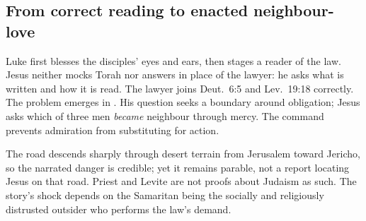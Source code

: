 \elementguard
\subsection*{From correct reading to enacted neighbour-love }

Luke first blesses the disciples' eyes and ears, then stages a reader of the
law. Jesus neither mocks Torah nor answers in place of the lawyer: he asks
what is written and how it is read. The lawyer joins Deut.~6:5 and Lev.~19:18
correctly. The problem emerges in . His
question seeks a boundary around obligation; Jesus asks which of three men
\emph{became} neighbour through mercy. The command  prevents admiration from substituting for action.

The road descends sharply through desert terrain from Jerusalem toward
Jericho, so the narrated danger is credible; yet it remains parable, not a
report locating Jesus on that road. Priest and Levite are not proofs about
Judaism as such. The story's shock depends on the Samaritan being the socially
and religiously distrusted outsider who performs the law's demand.

